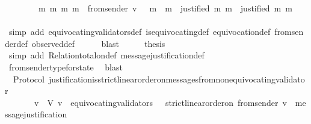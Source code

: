 \begin{isabellebody}
\ \ \ \ \ \ {\isasymlongrightarrow}\ {\isacharparenleft}{\isasymforall}\ m{}\ m{}{\isachardot}\ {\isacharbraceleft}m{}{\isacharcomma}\ m{}{\isacharbraceright}\ {\isasymsubseteq}\ from{\isacharunderscore}sender\ {\isacharparenleft}v{\isacharcomma}\ {\isasymsigma}{\isacharparenright}\ {\isasymlongrightarrow}\ m{}\ {\isacharequal}\ m{}\ {\isasymor}\ justified\ m{}\ m{}\ {\isasymor}\ justified\ m{}\ m{}{\isacharparenright}{\isacharparenright}{\isachardoublequoteclose}\ \isanewline
\ \ \ \ \isamarkupfalse%
\ {\isacharparenleft}simp\ add{\isacharcolon}\ equivocating{\isacharunderscore}validators{\isacharunderscore}def\ is{\isacharunderscore}equivocating{\isacharunderscore}def\ equivocation{\isacharunderscore}def\ from{\isacharunderscore}sender{\isacharunderscore}def\ observed{\isacharunderscore}def{\isacharparenright}\isanewline
\ \ \ \ \isamarkupfalse%
\ blast\isanewline
\ \ \isamarkupfalse%
\ \isamarkupfalse%
\ {\isacharquery}thesis\isanewline
\ \ \ \ \isamarkupfalse%
\ {\isacharparenleft}simp\ add{\isacharcolon}\ Relation{\isachardot}total{\isacharunderscore}on{\isacharunderscore}def\ message{\isacharunderscore}justification{\isacharunderscore}def{\isacharparenright}\isanewline
\ \ \ \ \isamarkupfalse%
\ from{\isacharunderscore}sender{\isacharunderscore}type{\isacharunderscore}for{\isacharunderscore}state\ \isamarkupfalse%
\ blast\isanewline
{}\isamarkupfalse%
%
\endisatagproof
{\isafoldproof}%
%
\isadelimproof
\isanewline
%
\endisadelimproof
\isanewline
{}\isamarkupfalse%
\ {\isacharparenleft}\ Protocol{\isacharparenright}\ justification{\isacharunderscore}is{\isacharunderscore}strict{\isacharunderscore}linear{\isacharunderscore}order{\isacharunderscore}on{\isacharunderscore}messages{\isacharunderscore}from{\isacharunderscore}non{\isacharunderscore}equivocating{\isacharunderscore}validator{\isacharcolon}\isanewline
\ \ {\isachardoublequoteopen}{\isasymforall}\ {\isasymsigma}\ {\isasymin}\ {\isasymSigma}{\isachardot}\ {\isacharparenleft}{\isasymforall}\ v\ {\isasymin}\ V{\isachardot}\ v\ {\isasymnotin}\ equivocating{\isacharunderscore}validators\ {\isasymsigma}\ {\isasymlongrightarrow}\ strict{\isacharunderscore}linear{\isacharunderscore}order{\isacharunderscore}on\ {\isacharparenleft}from{\isacharunderscore}sender\ {\isacharparenleft}v{\isacharcomma}\ {\isasymsigma}{\isacharparenright}{\isacharparenright}\ message{\isacharunderscore}justification{\isacharparenright}{\isachardoublequoteclose}\isanewline

\end{isabellebody}
